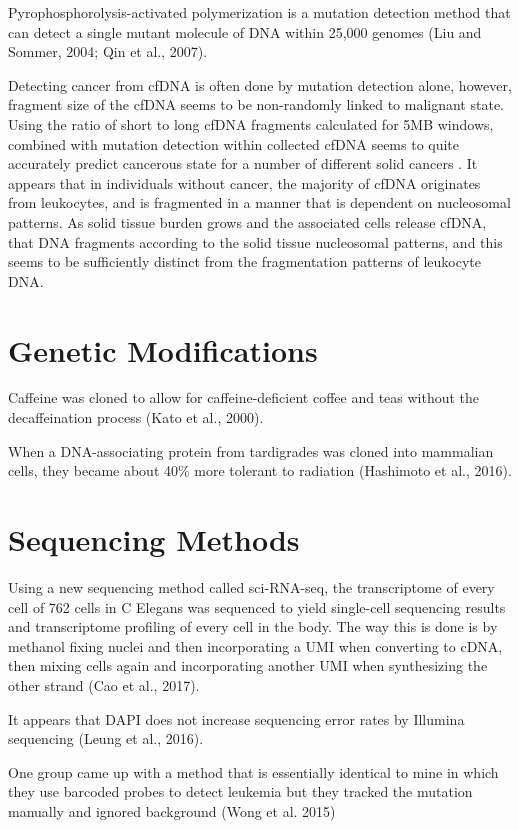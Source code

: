 \documentclass[]{book}
\begin{document}
Pyrophosphorolysis-activated polymerization is a mutation detection
method that can detect a single mutant molecule of DNA within 25,000
genomes (Liu and Sommer, 2004; Qin et al., 2007).

Detecting cancer from cfDNA is often done by mutation detection alone,
however, fragment size of the cfDNA seems to be non-randomly linked to
malignant state. Using the ratio of short to long cfDNA fragments
calculated for 5MB windows, combined with mutation detection within
collected cfDNA seems to quite accurately predict cancerous state for a
number of different solid cancers \citep{cristiano2019genome}. It
appears that in individuals without cancer, the majority of cfDNA
originates from leukocytes, and is fragmented in a manner that is
dependent on nucleosomal patterns. As solid tissue burden grows and the
associated cells release cfDNA, that DNA fragments according to the
solid tissue nucleosomal patterns, and this seems to be sufficiently
distinct from the fragmentation patterns of leukocyte DNA.

\section{Genetic Modifications}\label{genetic-modifications}

Caffeine was cloned to allow for caffeine-deficient coffee and teas
without the decaffeination process (Kato et al., 2000).

When a DNA-associating protein from tardigrades was cloned into
mammalian cells, they became about 40\% more tolerant to radiation
(Hashimoto et al., 2016).

\section{Sequencing Methods}\label{sequencing-methods}

Using a new sequencing method called sci-RNA-seq, the transcriptome of
every cell of 762 cells in C Elegans was sequenced to yield single-cell
sequencing results and transcriptome profiling of every cell in the
body. The way this is done is by methanol fixing nuclei and then
incorporating a UMI when converting to cDNA, then mixing cells again and
incorporating another UMI when synthesizing the other strand (Cao et
al., 2017).

It appears that DAPI does not increase sequencing error rates by
Illumina sequencing (Leung et al., 2016).

One group came up with a method that is essentially identical to mine in
which they use barcoded probes to detect leukemia but they tracked the
mutation manually and ignored background (Wong et al. 2015)
\end{document}
